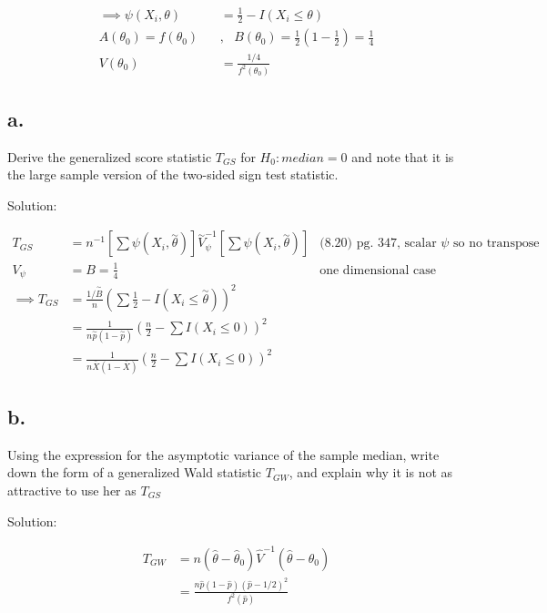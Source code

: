 \documentclass[
  letterpaper,
  DIV=11,
  numbers=noendperiod]{scrreprt}
\begin{document}
\[\begin{aligned}
\implies \psi(X_i, \theta) &= \frac 1 2 - I(X_i \leq \theta) \\
A(\theta_0) = f(\theta_0) ~~~~&,~~~B(\theta_0) = \frac 1 2\left(1-\frac 1 2\right)=\frac 1 4 \\
V(\theta_0) &= \frac{1/4}{f^2(\theta_0)}
\end{aligned}\]

\hypertarget{a.-9}{%
\subsection{a.}\label{a.-9}}

Derive the generalized score statistic \(T_{GS}\) for
\(H_0: median = 0\) and note that it is the large sample version of the
two-sided sign test statistic.

Solution:

\[\begin{aligned}
T_{GS} &= n^{-1} \left[\sum \psi(X_i, \overset \sim \theta) \right] \overset \sim V_{\psi}^{-1} \left[\sum \psi(X_i, \overset \sim \theta) \right]  & \text{(8.20) pg. 347, scalar } \psi \text{ so no transpose}\\
V_{\psi} &= B = \frac 1 4  & \text{one dimensional case reduction, pg. 347} \\
\implies T_{GS} &= \frac {1/\overset \sim B} n \left(\sum \frac 1 2 - I(X_i \leq \overset \sim \theta) \right)^2 \\
&= \frac {1} {n \overset \sim p(1- \overset \sim p)} \left(\frac n 2 - \sum I(X_i \leq 0) \right)^2\\
&= \frac {1} {n\bar X \left(1- \bar X \right)} \left(\frac n 2 - \sum I(X_i \leq 0) \right)^2
\end{aligned}\]

\hypertarget{b.-7}{%
\subsection{b.}\label{b.-7}}

Using the expression for the asymptotic variance of the sample median,
write down the form of a generalized Wald statistic \(T_{GW}\), and
explain why it is not as attractive to use her as \(T_{GS}\)

Solution:

\[\begin{aligned}
T_{GW} &= n(\hat \theta - \hat \theta_0)\hat V^{-1}(\hat \theta - \theta_0)\\
&=\frac{n \hat p(1-\hat p)(\hat p- 1/2)^2}{f^2(\hat p)} \\
\end{aligned}\]
\end{document}
